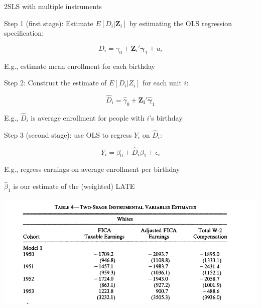 \documentclass[11pt,english,handout]{beamer}
\newenvironment{wideitemize}{\itemize\addtolength{\itemsep}{10pt}}{\enditemize}
\begin{document}
\begin{frame}{2SLS with multiple instruments}
\begin{wideitemize}
		\item
		Step 1 (first stage): Estimate $E[D_i | \bm{Z}_i]$ by estimating the OLS regression specification:
		
		$$D_i = \gamma_0 + \bm{Z}_i' \bm{\gamma}_1 + u _i$$
		
		E.g., estimate mean enrollment for each birthday			
		\pause
		\item
		Step 2: Construct the estimate of $E[D_i | Z_i]$ for each unit $i$:
		
		$$\hat{D}_i = \hat\gamma_0 + \bm{Z_i}' \bm{\hat\gamma}_1$$
		
		E.g., $\hat{D}_i$ is average enrollment for people with $i$'s birthday
		
		\pause
		\item
		Step 3 (second stage): use OLS to regress $Y_i$ on $\hat{D}_i$:
		
		$$Y_i = \beta_0 + \hat{D}_i \beta_1 + \epsilon_{i}$$
		
		E.g., regress earnings on average enrollment per birthday
		
		
		\pause
		\item
		$\hat\beta_1$ is our estimate of the (weighted) LATE
	\end{wideitemize}


\end{frame}


\begin{frame}
	\includegraphics[width = 0.9 \linewidth]{angrist-2sls}
\end{frame}
\end{document}
